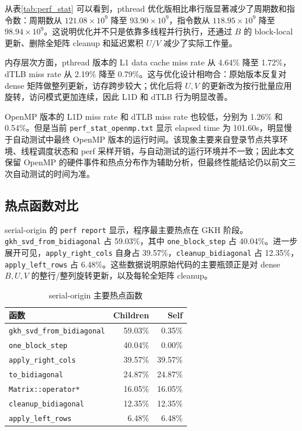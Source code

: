 ﻿\documentclass[UTF8,a4paper]{ctexart}
\begin{document}
从表\ref{tab:perf_stat} 可以看到，pthread 优化版相比串行版显著减少了周期数和指令数：周期数从 $121.08\times10^9$ 降至 $93.90\times10^9$，指令数从 $118.95\times10^9$ 降至 $98.94\times10^9$。这说明优化并不只是依靠多线程并行执行，还通过 $B$ 的 block-local 更新、删除全矩阵 cleanup 和延迟累积 $U/V$ 减少了实际工作量。

内存层次方面，pthread 版本的 L1 data cache miss rate 从 4.64\% 降至 1.72\%，dTLB miss rate 从 2.19\% 降至 0.79\%。这与优化设计相吻合：原始版本反复对 dense 矩阵做整列更新，访存跨步较大；优化后将 $U,V$ 的更新改为按行批量应用旋转，访问模式更加连续，因此 L1D 和 dTLB 行为明显改善。

OpenMP 版本的 L1D miss rate 和 dTLB miss rate 也较低，分别为 1.26\% 和 0.54\%。但是当前 \texttt{perf\_stat\_openmp.txt} 显示 elapsed time 为 101.60s，明显慢于自动测试中最终 OpenMP 版本的运行时间。该现象主要来自登录节点共享环境、线程调度状态和 perf 采样开销，与自动测试的运行环境并不一致；因此本文保留 OpenMP 的硬件事件和热点分布作为辅助分析，但最终性能结论仍以前文三次自动测试的时间为准。

\subsection{热点函数对比}

serial-origin 的 \texttt{perf report} 显示，程序最主要热点在 GKH 阶段。\texttt{gkh\_svd\_from\_bidiagonal} 占 59.03\%，其中 \texttt{one\_block\_step} 占 40.04\%。进一步展开可见，\texttt{apply\_right\_cols} 自身占 39.57\%，\texttt{cleanup\_bidiagonal} 占 12.35\%，\texttt{apply\_left\_rows} 占 6.48\%。这些数据说明原始代码的主要瓶颈正是对 dense $B,U,V$ 的整行/整列旋转更新，以及每轮全矩阵 cleanup。

\begin{table}[H]
\centering
\caption{serial-origin 主要热点函数}
\label{tab:perf_origin_hotspot}
\begin{tabular}{lrr}
\toprule
函数 & Children & Self \\
\midrule
\texttt{gkh\_svd\_from\_bidiagonal} & 59.03\% & 0.35\% \\
\texttt{one\_block\_step} & 40.04\% & 0.00\% \\
\texttt{apply\_right\_cols} & 39.57\% & 39.57\% \\
\texttt{to\_bidiagonal} & 24.87\% & 24.87\% \\
\texttt{Matrix::operator*} & 16.05\% & 16.05\% \\
\texttt{cleanup\_bidiagonal} & 12.35\% & 12.35\% \\
\texttt{apply\_left\_rows} & 6.48\% & 6.48\% \\
\bottomrule
\end{tabular}
\end{table}
\end{document}
